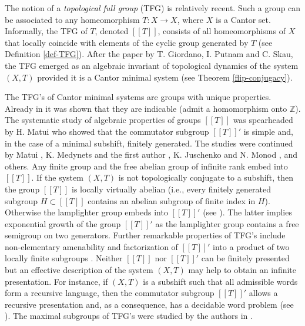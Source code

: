 \documentclass[12pt]{article}
\theoremstyle{definition}
\def\bZ{\mathbb{Z}}
\begin{document}
The notion of a \emph{topological full group} (TFG) is relatively recent.  
Such a group can be associated to any homeomorphism $T:X\to X$, where $X$ 
is a Cantor set.  Informally, the TFG of $T$, denoted $[[T]]$, consists of 
all homeomorphisms of $X$ that locally coincide with elements of the cyclic 
group generated by $T$ (see Definition \ref{def-TFG}).  After the paper 
\cite{GPS} by T. Giordano, I. Putnam and C. Skau, the TFG emerged as an 
algebraic invariant of topological dynamics of the system $(X,T)$ provided 
it is a Cantor minimal system (see Theorem \ref{flip-conjugacy}).

The TFG's of Cantor minimal systems are groups with unique properties.  
Already in \cite{GPS} it was shown that they are indicable (admit a 
homomorphism onto $\bZ$).  The systematic study of algebraic properties of 
groups $[[T]]$ was spearheaded by H. Matui \cite{Matui} who showed that the 
commutator subgroup $[[T]]'$ is simple and, in the case of a minimal 
subshift, finitely generated.  The studies were continued by Matui 
\cite{Matui2}, K. Medynets and the first author \cite{GrigMed,GrigMed2}, K. 
Juschenko and N. Monod \cite{JuschMonod}, and others.  Any finite group and 
the free abelian group of infinite rank embed into $[[T]]$.  If the system 
$(X,T)$ is not topologically conjugate to a subshift, then the group 
$[[T]]$ is locally virtually abelian (i.e., every finitely generated 
subgroup $H\subset [[T]]$ contains an abelian subgroup of finite index in 
$H$).  Otherwise the lamplighter group embeds into $[[T]]'$ (see 
\cite{Matui2}).  The latter implies exponential growth of the group 
$[[T]]'$ as the lamplighter group contains a free semigroup on two 
generators.  Further remarkable properties of TFG's include non-elementary 
amenability \cite{JuschMonod} and factorization of $[[T]]'$ into a product 
of two locally finite subgroups \cite{Matui,GrigMed}.  Neither $[[T]]$ nor 
$[[T]]'$ can be finitely presented but an effective description of the 
system $(X,T)$ may help to obtain an infinite presentation.  For instance, 
if $(X,T)$ is a subshift such that all admissible words form a recursive 
language, then the commutator subgroup $[[T]]'$ allows a recursive 
presentation and, as a consequence, has a decidable word problem (see 
\cite{GrigMed2}).  The maximal subgroups of TFG's were studied by the 
authors in \cite{GrigVor24}.
\end{document}

